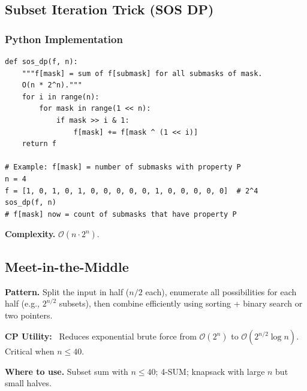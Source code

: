 \documentclass[10pt,a4paper]{article}
\theoremstyle{cpstyle}
\newenvironment{cputility}{%
  \begin{mdframed}[backgroundcolor=theorembg, linecolor=accent!50, linewidth=1pt,
    innerleftmargin=10pt, innerrightmargin=10pt, innertopmargin=6pt, innerbottommargin=6pt]
  \textbf{\color{accent}CP Utility:}~}{%
  \end{mdframed}}
\newcommand{\bigO}[1]{\mathcal{O}\!\left(#1\right)}
\begin{document}
\subsection{Subset Iteration Trick (SOS DP)}

\subsubsection{Python Implementation}
\begin{lstlisting}[caption={SOS (Sum over Subsets) DP}]
def sos_dp(f, n):
    """f[mask] = sum of f[submask] for all submasks of mask.
    O(n * 2^n)."""
    for i in range(n):
        for mask in range(1 << n):
            if mask >> i & 1:
                f[mask] += f[mask ^ (1 << i)]
    return f

# Example: f[mask] = number of submasks with property P
n = 4
f = [1, 0, 1, 0, 1, 0, 0, 0, 0, 0, 1, 0, 0, 0, 0, 0]  # 2^4
sos_dp(f, n)
# f[mask] now = count of submasks that have property P
\end{lstlisting}

\textbf{Complexity.} $\bigO{n \cdot 2^n}$.

\subsection{Meet-in-the-Middle}

\textbf{Pattern.} Split the input in half ($n/2$ each), enumerate all possibilities for each half (e.g., $2^{n/2}$ subsets), then combine efficiently using sorting + binary search or two pointers.

\begin{cputility}
Reduces exponential brute force from $\bigO{2^n}$ to $\bigO{2^{n/2} \log n}$. Critical when $n \leq 40$.
\end{cputility}

\textbf{Where to use.} Subset sum with $n \leq 40$; 4-SUM; knapsack with large $n$ but small halves.
\end{document}
